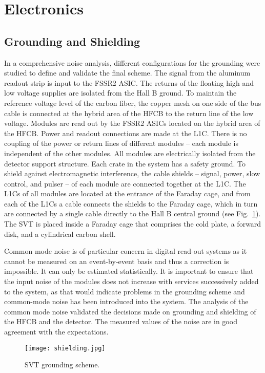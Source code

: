 \section{Electronics}

\subsection{Grounding and Shielding}

In a comprehensive noise analysis, different configurations for the grounding were studied to define and validate the final scheme. The signal from the aluminum readout strip is input to the FSSR2 ASIC. The returns of the floating high and low voltage supplies are isolated from the Hall B ground. To maintain the reference voltage level of the carbon fiber, the copper mesh on one side of the bus cable is connected at the hybrid area of the HFCB to the return line of the low voltage. Modules are read out by the FSSR2 ASICs located on the hybrid area of the HFCB. Power and readout connections are made at the L1C. There is no coupling of the power or return lines of different modules -- each module is independent of the other modules. All modules are electrically isolated from the detector support structure. Each crate in the system has a safety ground. To shield against electromagnetic interference, the cable shields -- signal, power, slow control, and pulser -- of each module are connected together at the L1C. The L1Cs of all modules are located at the entrance of the Faraday cage, and from each of the L1Cs a cable connects the shields to the Faraday cage, which in turn are connected by a single cable directly to the Hall B central ground (see Fig.~\ref{fig:shielding}). The SVT is placed inside a Faraday cage that comprises the cold plate, a forward disk, and a cylindrical carbon shell. 

Common mode noise is of particular concern in digital read-out systems as it cannot be measured on an event-by-event basis and thus a correction is impossible. It can only be estimated statistically. It is important to ensure that the input noise of the modules does not increase with services successively added to the system, as that would indicate problems in the grounding scheme and common-mode noise has been introduced into the system. The analysis of the common mode noise validated the decisions made on grounding and shielding of the HFCB and the detector. The measured values of the noise are in good agreement with the expectations.

\begin{figure}[hbt] 
\centering 
\texttt{[image: shielding.jpg]}
\caption{SVT grounding scheme.}
\label{fig:shielding}
\end{figure}

